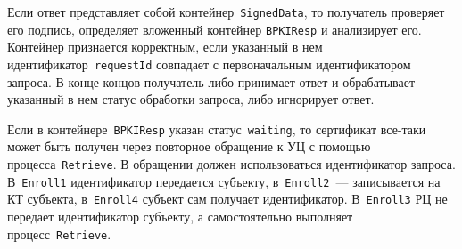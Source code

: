 Если ответ представляет собой контейнер~\texttt{SignedData}, 
то получатель проверяет его подпись, определяет вложенный контейнер 
\texttt{BPKIResp} и анализирует его. Контейнер признается
корректным, если указанный в нем идентификатор~\texttt{requestId}
совпадает с первоначальным идентификатором запроса.
%
В конце концов получатель либо принимает ответ и обрабатывает указанный 
в нем статус обработки запроса, либо игнорирует ответ.


Если в контейнере~\texttt{BPKIResp} указан статус~\texttt{waiting}, то сертификат 
все-таки может быть получен через повторное обращение к УЦ с помощью 
процесса~\texttt{Retrieve}. В обращении должен использоваться 
идентификатор запроса. 
%
В~\texttt{Enroll1} идентификатор передается субъекту,
в~\texttt{Enroll2}~--- записывается на КТ субъекта,
в~\texttt{Enroll4} субъект сам получает идентификатор.
%
В~\texttt{Enroll3} РЦ не передает идентификатор субъекту, 
а самостоятельно выполняет процесс~\texttt{Retrieve}.


